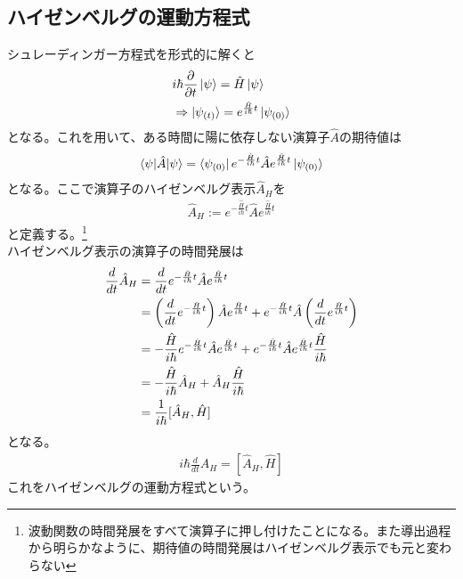 \documentclass{jsarticle}  %
\numberwithin{equation}{section} %
\numberwithin{figure}{section}
\begin{document}
\subsection{ハイゼンベルグの運動方程式}
    シュレーディンガー方程式を形式的に解くと
    \begin{align}
        &i\hbar \frac{\partial}{\partial t} \ket{\psi} = \hat{H} \ket{\psi} \notag \\
        &\Rightarrow \ket{\psi_{(t)}} = e^{\frac{\hat{H}}{i\hbar}t} \ket{\psi_{(0)}}
    \end{align}
    となる。これを用いて、ある時間に陽に依存しない演算子$\hat{A}$の期待値は
    \begin{align}
        \braket{\psi|\hat{A}|\psi} = \bra{\psi_{(0)}}e^{-\frac{\hat{H}}{i\hbar}t} \hat{A}e^{\frac{\hat{H}}{i\hbar}t} \ket{\psi_{(0)}}
    \end{align}
    となる。ここで演算子のハイゼンベルグ表示$\hat{A}_H$を
    \begin{align}
        \hat{A}_H := e^{-\frac{\hat{H}}{i\hbar}t} \hat{A}e^{\frac{\hat{H}}{i\hbar}t}
    \end{align}
    と定義する。\footnote{波動関数の時間発展をすべて演算子に押し付けたことになる。また導出過程から明らかなように、期待値の時間発展はハイゼンベルグ表示でも元と変わらない}\\
    ハイゼンベルグ表示の演算子の時間発展は
    \begin{align}
        \frac{d}{dt} \hat{A}_H &= \frac{d}{dt} e^{-\frac{\hat{H}}{i\hbar}t} \hat{A}e^{\frac{\hat{H}}{i\hbar}t} \notag \\
        &= \left( \frac{d}{dt} e^{-\frac{\hat{H}}{i\hbar}t} \right)\hat{A}e^{\frac{\hat{H}}{i\hbar}t} +  e^{-\frac{\hat{H}}{i\hbar}t} \hat{A} \left( \frac{d}{dt}e^{\frac{\hat{H}}{i\hbar}t} \right) \notag \\
        &= -\frac{\hat{H}}{i\hbar} e^{-\frac{\hat{H}}{i\hbar}t} \hat{A}e^{\frac{\hat{H}}{i\hbar}t} + e^{-\frac{\hat{H}}{i\hbar}t} \hat{A}e^{\frac{\hat{H}}{i\hbar}t} \frac{\hat{H}}{i\hbar} \notag \\
        &= -\frac{\hat{H}}{i\hbar} \hat{A}_H + \hat{A}_H \frac{\hat{H}}{i\hbar} \notag \\
        &= \frac{1}{i\hbar} [\hat{A}_H,\hat{H}]
    \end{align}
    となる。
    \begin{align}
        i\hbar \frac{d}{dt} \hat{A}_H = [\hat{A}_H,\hat{H}]
    \end{align}
    これをハイゼンベルグの運動方程式という。\\
\end{document}
